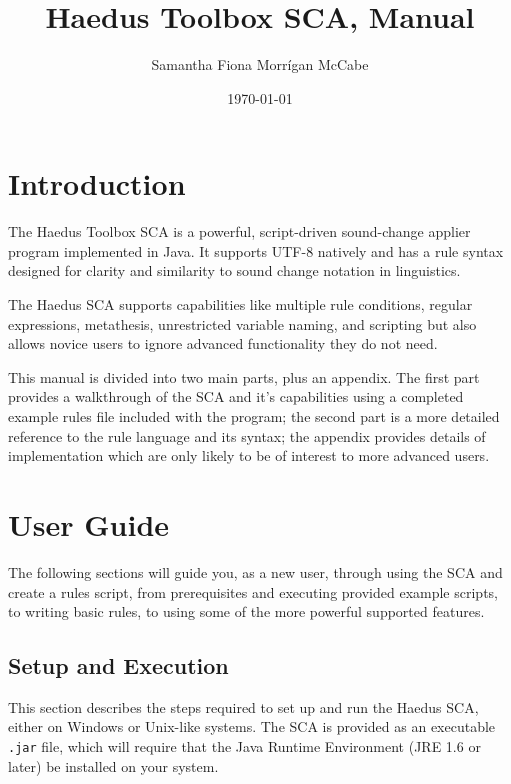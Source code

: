 \documentclass[10pt,letterpaper]{article}
\title{Haedus Toolbox SCA, Manual}
\author{Samantha Fiona Morrígan McCabe}
\date{\today}
\begin{document}
\maketitle
\tableofcontents

\section*{Introduction} 
\label{sec:introduction}
The Haedus Toolbox SCA is a powerful, script-driven sound-change applier program implemented in Java. It supports UTF-8 natively and has a rule syntax designed for clarity and similarity to sound change notation in linguistics.

The Haedus SCA supports capabilities like multiple rule conditions, regular expressions, metathesis, unrestricted variable naming, and scripting but also allows novice users to ignore advanced functionality they do not need.

This manual is divided into two main parts, plus an appendix. The first part provides a walkthrough of the SCA and it's capabilities using a completed example rules file included with the program; the second part is a more detailed reference to the rule language and its syntax; the appendix provides details of implementation which are only likely to be of interest to more advanced users.


\section{User Guide} 
\label{prt:user_guide}
The following sections will guide you, as a new user, through using the SCA and create a rules script, from prerequisites and executing provided example scripts, to writing basic rules, to using some of the more powerful supported features.


\subsection{Setup and Execution}
\label{sec:setup_and_execution}
This section describes the steps required to set up and run the Haedus SCA, either on Windows or Unix-like systems. The SCA is provided as an executable \texttt{.jar} file, which will require that the Java Runtime Environment (JRE 1.6 or later) be installed on your system.
\end{document}
